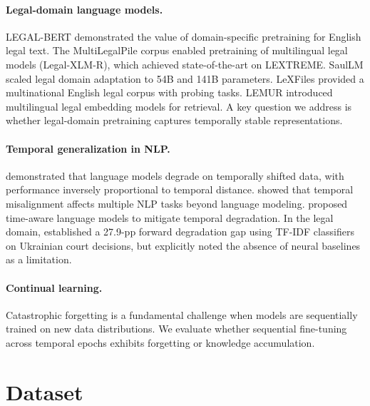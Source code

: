 \documentclass[11pt]{article}
\begin{document}
\paragraph{Legal-domain language models.}
LEGAL-BERT \citep{chalkidis2020legal} demonstrated the value of domain-specific pretraining for English legal text. The MultiLegalPile corpus \citep{niklaus2023multilegalpile} enabled pretraining of multilingual legal models (Legal-XLM-R), which achieved state-of-the-art on LEXTREME. SaulLM \citep{colombo2024saullm} scaled legal domain adaptation to 54B and 141B parameters. LeXFiles \citep{chalkidis2023lexfiles} provided a multinational English legal corpus with probing tasks. LEMUR \citep{ahmadi2026lemur} introduced multilingual legal embedding models for retrieval. A key question we address is whether legal-domain pretraining captures temporally stable representations.

\paragraph{Temporal generalization in NLP.}
\citet{lazaridou2021temporal} demonstrated that language models degrade on temporally shifted data, with performance inversely proportional to temporal distance. \citet{luu2022temporal} showed that temporal misalignment affects multiple NLP tasks beyond language modeling. \citet{dhingra2022time} proposed time-aware language models to mitigate temporal degradation. In the legal domain, \citet{ovcharov2025tokenizer} established a 27.9-pp forward degradation gap using TF-IDF classifiers on Ukrainian court decisions, but explicitly noted the absence of neural baselines as a limitation.

\paragraph{Continual learning.}
Catastrophic forgetting \citep{kirkpatrick2017overcoming} is a fundamental challenge when models are sequentially trained on new data distributions. We evaluate whether sequential fine-tuning across temporal epochs exhibits forgetting or knowledge accumulation.

\section{Dataset}
\end{document}
